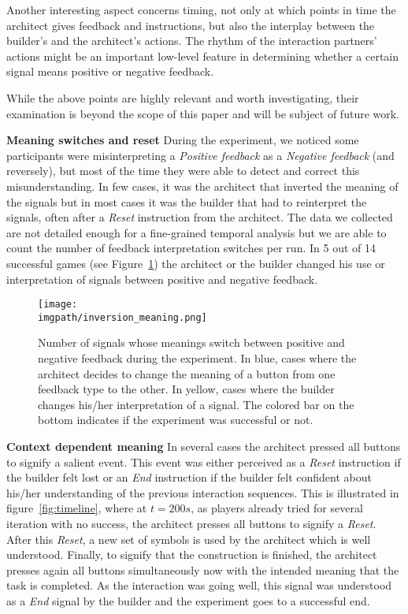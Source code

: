 Another interesting aspect concerns timing, not only at which points in time the architect gives feedback and instructions, but also the interplay between the builder's and the architect's actions. The rhythm of the interaction partners' actions might be an important low-level feature in determining whether a certain signal means positive or negative feedback.

While the above points are highly relevant and worth investigating, their examination is beyond the scope of this paper and will be subject of future work.

\textbf{Meaning switches and reset} During the experiment, we noticed some participants were misinterpreting a \emph{Positive feedback} as a \emph{Negative feedback} (and reversely), but most of the time they were able to detect and correct this misunderstanding. In few cases, it was the architect that inverted the meaning of the signals but in most cases it was the builder that had to reinterpret the signals, often after a \emph{Reset} instruction from the architect. The data we collected are not detailed enough for a fine-grained temporal analysis but we are able to count the number of feedback interpretation switches per run. In 5 out of 14 successful games (see Figure~\ref{fig:feedback_switch_enhanced}) the architect or the builder changed his use or interpretation of signals between positive and negative feedback.

\begin{figure}[!ht]
  \begin{center}
      \texttt{[image: \\imgpath/inversion\_meaning.png]}
      \caption{Number of signals whose meanings switch between positive and negative feedback during the experiment. In blue, cases where the architect decides to change the meaning of a button from one feedback type to the other. In yellow, cases where the builder changes his/her interpretation of a signal. The colored bar on the bottom indicates if the experiment was successful or not.}
    \label{fig:feedback_switch_enhanced}
    \end{center}
\end{figure}

\textbf{Context dependent meaning} In several cases the architect pressed all buttons to signify a salient event. This event was either perceived as a \emph{Reset} instruction if the builder felt lost or an \emph{End} instruction if the builder felt confident about his/her understanding of the previous interaction sequences. This is illustrated in figure~\ref{fig:timeline}, where at $t=200 s$, as players already tried for several iteration with no success, the architect presses all buttons to signify a \emph{Reset}. After this \emph{Reset}, a new set of symbols is used by the architect which is well understood. Finally, to signify that the construction is finished, the architect presses again all buttons simultaneously now with the intended meaning that the task is completed. As the interaction was going well, this signal was understood as a \emph{End} signal by the builder and the experiment goes to a successful end.

